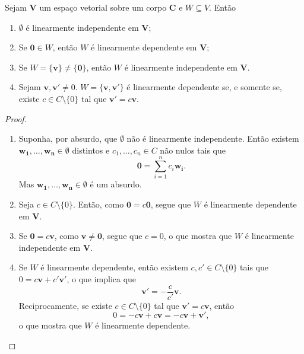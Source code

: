 \begin{proposition}
	Sejam $\bm V$ um espaço vetorial sobre um corpo $\bm C$ e $W \subseteq V$. Então
	\begin{enumerate}
	\item $\emptyset$ é linearmente independente em $\bm V$;
	\item Se $\bm 0 \in W$, então $W$ é linearmente dependente em $\bm V$;
	\item Se $W=\{\bm v\}\neq\{\bm 0\}$, então $W$ é linearmente independente em $\bm V$.
	\item Sejam $\bm v,\bm v' \neq 0$. $W = \{\bm v,\bm v'\}$ é linearmente dependente se, e somente se, existe $c \in C \setminus \{0\}$ tal que $\bm v' = c\bm v$.
	\end{enumerate}
\end{proposition}
\begin{proof}
	\begin{enumerate}
	\item Suponha, por absurdo, que $\emptyset$ não é linearmente independente. Então existem $\bm{w_1},\ldots,\bm{w_n} \in \emptyset$ distintos e $c_1,\ldots,c_n \in C$ não nulos tais que
	\begin{equation*}
	\bm 0 = \sum_{i=1}^n c_i\bm{w_i}.
	\end{equation*}
Mas $\bm{w_1},\ldots,\bm{w_n} \in \emptyset$ é um absurdo.
	\item Seja $c \in C \setminus \{0\}$. Então, como $\bm 0 = c \bm 0$, segue que $W$ é linearmente dependente em $\bm V$.
	\item Se $\bm 0 = c\bm v$, como $\bm v \neq \bm 0$, segue que $c=0$, o que mostra que $W$ é linearmente independente em $\bm V$.
	\item Se $W$ é linearmente dependente, então existem $c,c' \in C \setminus \{0\}$ tais que $0 = c\bm v + c' \bm v'$, o que implica que
		\begin{equation*}
		\bm v' = -\frac{c}{c'} \bm v.
		\end{equation*}
Reciprocamente, se existe $c \in C \setminus \{0\}$ tal que $\bm v' = c\bm v$, então
	\begin{equation*}
	0 = -c \bm v +c\bm v = -c \bm v + \bm v',
	\end{equation*}
o que mostra que $W$ é linearmente dependente.
	\end{enumerate}
\end{proof}

